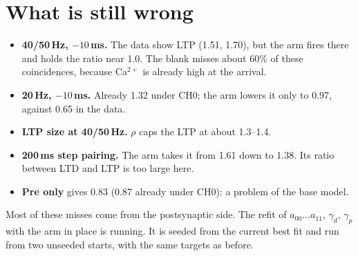 \documentclass[11pt]{article}
\begin{document}
\section{What is still wrong}
\begin{itemize}
  \item \textbf{40/50\,Hz, $-10$\,ms.} The data show LTP (1.51, 1.70), but the arm fires there and holds the ratio
        near 1.0. The blank misses about 60\% of these coincidences, because Ca$^{2+}$ is already high at the arrival.
  \item \textbf{20\,Hz, $-10$\,ms.} Already 1.32 under CH0; the arm lowers it only to 0.97, against 0.65 in the data.
  \item \textbf{LTP size at 40/50\,Hz.} $\rho$ caps the LTP at about 1.3--1.4.
  \item \textbf{200\,ms step pairing.} The arm takes it from 1.61 down to 1.38. Its ratio between LTD and LTP is too
        large here.
  \item \textbf{Pre only} gives 0.83 (0.87 already under CH0): a problem of the base model.
\end{itemize}
Most of these misses come from the postsynaptic side. The refit of $a_{00}\dots a_{11}$, $\gamma_d$, $\gamma_p$ with
the arm in place is running. It is seeded from the current best fit and run from two unseeded starts, with the same
targets as before.

\end{document}
